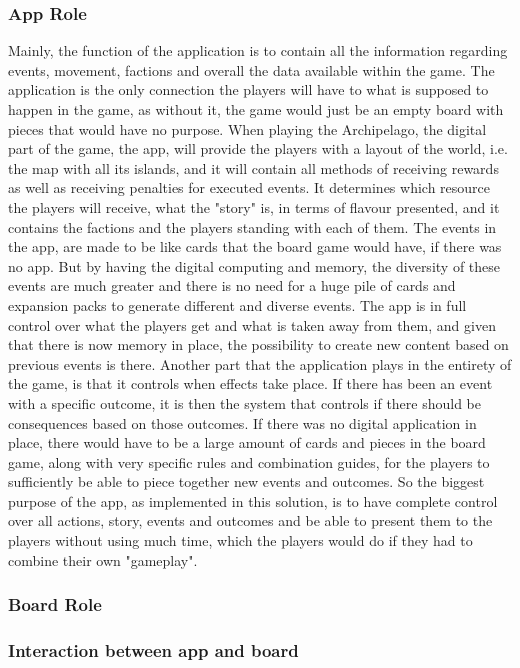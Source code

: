 \subsubsection{App Role}
Mainly, the function of the application is to contain all the information regarding events, movement, factions and overall the data available within the game. The application is the only connection the players will have to what is supposed to happen in the game, as without it, the game would just be an empty board with pieces that would have no purpose. 
When playing the Archipelago, the digital part of the game, the app, will provide the players with a layout of the world, i.e. the map with all its islands, and it will contain all methods of receiving rewards as well as receiving penalties for executed events. It determines which resource the players will receive, what the "story" is, in terms of flavour presented, and it contains the factions and the players standing with each of them.
The events in the app, are made to be like cards that the board game would have, if there was no app. But by having the digital computing and memory, the diversity of these events are much greater and there is no need for a huge pile of cards and expansion packs to generate different and diverse events. The app is in full control over what the players get and what is taken away from them, and given that there is now memory in place, the possibility to create new content based on previous events is there. Another part that the application plays in the entirety of the game, is that it controls when effects take place. If there has been an event with a specific outcome, it is then the system that controls if there should be consequences based on those outcomes. If there was no digital application in place, there would have to be a large amount of cards and pieces in the board game, along with very specific rules and combination guides, for the players to sufficiently be able to piece together new events and outcomes. So the biggest purpose of the app, as implemented in this solution, is to have complete control over all actions, story, events and outcomes and be able to present them to the players without using much time, which the players would do if they had to combine their own "gameplay".


\subsubsection{Board Role}
\subsubsection{Interaction between app and board}


